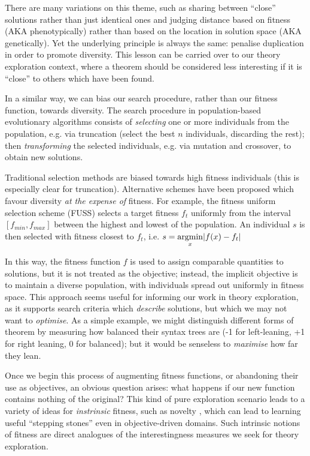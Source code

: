 There are many variations on this theme, such as sharing between ``close'' solutions rather than just identical ones and judging distance based on fitness (AKA phenotypically) rather than based on the location in solution space (AKA genetically). Yet the underlying principle is always the same: penalise duplication in order to promote diversity. This lesson can be carried over to our theory exploration context, where a theorem should be considered less interesting if it is ``close'' to others which have been found.

In a similar way, we can bias our search procedure, rather than our fitness function, towards diversity. The search procedure in population-based evolutionary algorithms consists of \emph{selecting} one or more individuals from the population, e.g. via truncation (select the best $n$ individuals, discarding the rest); then \emph{transforming} the selected individuals, e.g. via mutation and crossover, to obtain new solutions.

\newcommand{\argmin}{\operatornamewithlimits{argmin}}

Traditional selection methods are biased towards high fitness individuals (this is especially clear for truncation). Alternative schemes have been proposed which favour diversity \emph{at the expense of} fitness. For example, the fitness uniform selection scheme (FUSS) \citep{hutter2002fitness} selects a target fitness $f_t$ uniformly from the interval $\left[ f_{min}, f_{max} \right]$ between the highest and lowest of the population. An individual $s$ is then selected with fitness closest to $f_t$, i.e. $s = \operatornamewithlimits{argmin}\limits_{x} \lvert f(x) - f_t \rvert$

In this way, the fitness function $f$ is used to assign comparable quantities to solutions, but it is not treated as the objective; instead, the implicit objective is to maintain a diverse population, with individuals spread out uniformly in fitness space. This approach seems useful for informing our work in theory exploration, as it supports search criteria which \emph{describe} solutions, but which we may not want to \emph{optimise}. As a simple example, we might distinguish different forms of theorem by measuring how balanced their syntax trees are (-1 for left-leaning, +1 for right leaning, 0 for balanced); but it would be senseless to \emph{maximise} how far they lean.

Once we begin this process of augmenting fitness functions, or abandoning their use as objectives, an obvious question arises: what happens if our new function contains nothing of the original? This kind of pure exploration scenario leads to a variety of ideas for \emph{instrinsic} fitness, such as novelty \citep{lehman2011abandoning}, which can lead to learning useful ``stepping stones'' even in objective-driven domains. Such intrinsic notions of fitness are direct analogues of the interestingness measures we seek for theory exploration.

